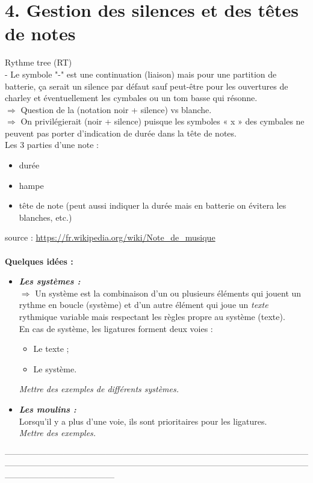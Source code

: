 \section*{4. Gestion des silences et des têtes de notes}
Rythme tree (RT)\\
- Le symbole "-" est une continuation (liaison) mais pour une partition de
batterie, ça serait un silence par défaut sauf peut-être pour les ouvertures
de charley et éventuellement les cymbales ou un tom basse qui résonne.\\
$\Rightarrow$ Question de la (notation noir + silence) vs blanche.\\
$\Rightarrow$ On privilégierait (noir + silence) puisque les symboles « x » des cymbales ne
\tab{}peuvent pas porter d’indication de durée dans la tête de notes.\\
Les 3 parties d’une note :
\begin{itemize}
	\item durée
	\item hampe
	\item tête de note (peut aussi indiquer la durée mais en batterie on évitera les blanches, etc.)
\end{itemize}
source : \url{https://fr.wikipedia.org/wiki/Note_de_musique}\\\\
\textbf{Quelques idées :}\\
\begin{itemize}
	\item \textbf{\textit{Les systèmes :}}\\
	$\Rightarrow$ Un système est la combinaison d’un ou plusieurs éléments qui jouent un rythme en boucle (système) et d’un autre élément qui joue un \textit{texte} rythmique variable mais respectant les règles propre au système (texte).\\
	En cas de système, les ligatures forment deux voies :
	\begin{itemize}
		\item Le texte ;
		\item Le système.
	\end{itemize}
	\textit{Mettre des exemples de différents systèmes.}
	\item \textbf{\textit{Les moulins :}}\\
	Lorsqu’il y a plus d’une voie, ils sont prioritaires pour les ligatures.\\
	\textit{Mettre des exemples.}\\
\end{itemize}
—————————————————————————————————————————————————————————————————————————————————————\\\\